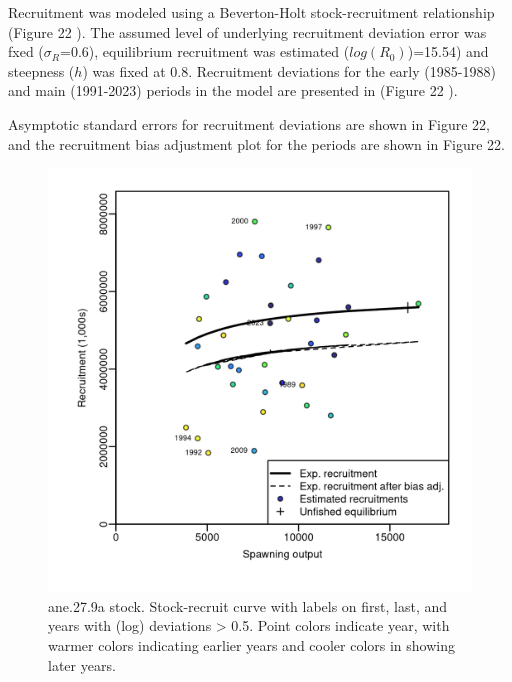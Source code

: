 \documentclass[
]{article}
\begin{document}
Recruitment was modeled using a Beverton-Holt stock-recruitment
relationship (Figure 22 ). The assumed level of underlying recruitment
deviation error was fxed (\(\sigma_R\)=0.6), equilibrium recruitment was
estimated (\(log(R_0)\))=15.54) and steepness (\(h\)) was fixed at 0.8.
Recruitment deviations for the early (1985-1988) and main (1991-2023)
periods in the model are presented in (Figure 22 ).

Asymptotic standard errors for recruitment deviations are shown in
Figure 22, and the recruitment bias adjustment plot for the periods are
shown in Figure 22.

\begin{figure}[H]

{\centering \includegraphics[width=0.95\linewidth]{report/run/S1.0_4FLEETS/fig_stock-recluta} 

}

\caption{ane.27.9a stock. Stock-recruit curve with labels on first, last, and years with (log) deviations > 0.5. Point colors indicate year, with warmer colors indicating earlier years and cooler colors in showing later years.}\label{fig:unnamed-chunk-31}
\end{figure}
\end{document}
